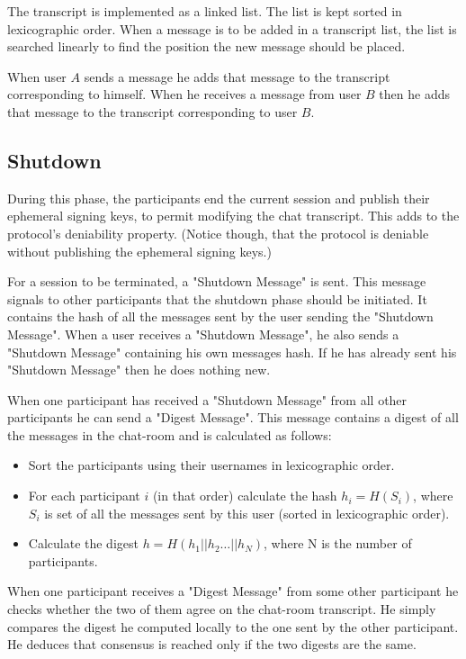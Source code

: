The transcript is implemented as a linked list. The list is kept sorted in lexicographic order.
When a message is to be added in a transcript list, the list is searched linearly to find the position the new message should be placed.

When user $A$ sends a message he adds that message to the transcript corresponding to himself.
When he receives a message from user $B$ then he adds that message to the transcript corresponding to user $B$.

\subsection{Shutdown}
\label{subsections:shutdown}
During this phase, the participants end the current session and publish their
ephemeral signing keys, to permit modifying the chat transcript. This adds to
the protocol's deniability property. (Notice though, that the protocol is
deniable without publishing the ephemeral signing keys.)

For a session to be terminated, a "Shutdown Message" is sent.
This message signals to other participants that the shutdown phase should be initiated.
It contains the  hash of all the messages sent by the user sending the "Shutdown Message".
When a user receives a "Shutdown Message", he also sends a "Shutdown Message" containing his own messages hash.
If he has already sent his "Shutdown Message" then he does nothing new.

When one participant has received a "Shutdown Message" from all other participants he can send a "Digest Message".
This message contains a digest of all the messages in the chat-room and is calculated as follows:
\begin{itemize}
  \item[] Sort the participants using their usernames in lexicographic order.
  \item[] For each participant $i$ (in that order) calculate the hash $h_i = H(S_i)$, where $S_i$ is set of all the messages sent by this user (sorted in lexicographic order).
  \item[] Calculate the digest $h = H(h_1 || h_2 \dots || h_N)$, where N is the number of participants.
\end{itemize}

When one participant receives a "Digest Message" from some other participant he checks whether the two of them agree on the chat-room transcript.
He simply compares the digest he computed locally to the one sent by the other participant.
He deduces that consensus is reached only if the two digests are the same.

